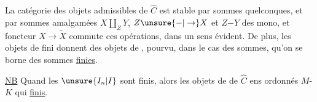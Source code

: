 La catégorie des objets admissibles de $\widehat C$ est stable par  sommes quelconques, et par sommes amalgamées $X\amalg_Z Y$,  $Z\unsure{\mathord{-}|\to}X$ et $Z\mathord{-}Y$ des mono, et  foncteur $X\to\widetilde X$ commute  ces opérations, dans un sens évident. De plus, les objets de  fini donnent des objets de , pourvu, \unsure{(}dans le cas des sommes\unsure{)|,}, qu'on se borne  des sommes \uline{finies}.

\uline{NB} Quand les $\unsure{I_n|I}$ sont finis, alors les objets  de  de $\widehat C$   ens ordonnés $M$- $K$ qui  \uline{finis}.
